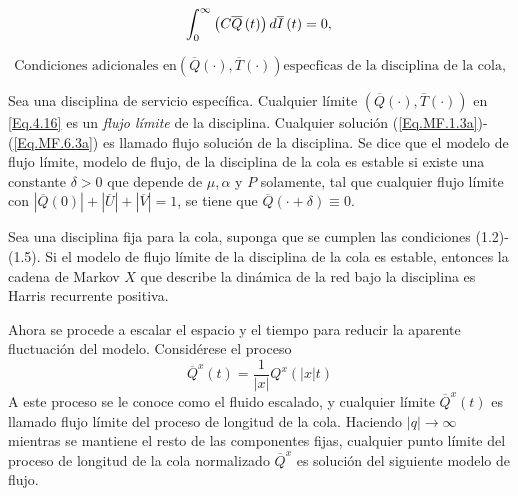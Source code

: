 \begin{Teo}
\begin{equation}\label{Eq.MF.5.3a}
\int_{0}^{\infty}\left(C\overline{Q}\left(t\right)\right)d\overline{I}\left(t\right)=0,\\
\end{equation}

\begin{equation}\label{Eq.MF.6.3a}
\textrm{Condiciones adicionales en
}\left(\overline{Q}\left(\cdot\right),\overline{T}\left(\cdot\right)\right)\textrm{
especficas de la disciplina de la cola,}
\end{equation}
\end{Teo}

\begin{Def}
Sea una disciplina de servicio espec\'ifica. Cualquier l\'imite
$\left(\overline{Q}\left(\cdot\right),\overline{T}\left(\cdot\right)\right)$
en \ref{Eq.4.16} es un {\em flujo l\'imite} de la disciplina.
Cualquier soluci\'on (\ref{Eq.MF.1.3a})-(\ref{Eq.MF.6.3a}) es
llamado flujo soluci\'on de la disciplina. Se dice que el modelo de flujo l\'imite, modelo de flujo, de la disciplina de la cola es estable si existe una constante
$\delta>0$ que depende de $\mu,\alpha$ y $P$ solamente, tal que
cualquier flujo l\'imite con
$|\overline{Q}\left(0\right)|+|\overline{U}|+|\overline{V}|=1$, se
tiene que $\overline{Q}\left(\cdot+\delta\right)\equiv0$.
\end{Def}

\begin{Teo}\label{Tma.4.2.Dai}
Sea una disciplina fija para la cola, suponga que se cumplen las
condiciones (1.2)-(1.5). Si el modelo de flujo l\'imite de la
disciplina de la cola es estable, entonces la cadena de Markov $X$
que describe la din\'amica de la red bajo la disciplina es Harris
recurrente positiva.
\end{Teo}

Ahora se procede a escalar el espacio y el tiempo para reducir la
aparente fluctuaci\'on del modelo. Consid\'erese el proceso
\begin{equation}\label{Eq.3.7}
\overline{Q}^{x}\left(t\right)=\frac{1}{|x|}Q^{x}\left(|x|t\right)
\end{equation}
A este proceso se le conoce como el fluido escalado, y cualquier l\'imite $\overline{Q}^{x}\left(t\right)$ es llamado flujo l\'imite del proceso de longitud de la cola. Haciendo $|q|\rightarrow\infty$ mientras se mantiene el resto de las componentes fijas, cualquier punto l\'imite del proceso de longitud de la cola normalizado $\overline{Q}^{x}$ es soluci\'on del siguiente modelo de flujo.

